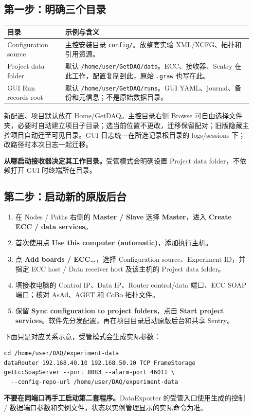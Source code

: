 \documentclass[11pt,a4paper]{article}
\newcommand{\ui}[1]{\textbf{#1}}
\newcommand{\code}[1]{\texttt{#1}}
\begin{document}
\subsection*{第一步：明确三个目录}
\par\smallskip\noindent\begin{tabularx}{\linewidth}{@{}L{43mm}Y@{}}\toprule
目录 & 示例与含义 \\\midrule
Configuration source & 主控安装目录 \code{config/}。放整套实验 XML/XCFG、拓扑和引用资源。\\
Project data folder & 默认 \code{/home/user/GetDAQ/data}。ECC、接收器、Sentry 在此工作，配置复制到此，原始 \code{.graw} 也写在此。\\
GUI Run records root & 默认 \code{/home/user/GetDAQ/runs}。GUI YAML、journal、备份和元信息；不是原始数据目录。\\\bottomrule
\end{tabularx}\par\smallskip
新配置、项目默认放在 Home/GetDAQ。主控目录右侧 Browse 可自由选择文件夹，必要时自动建立项目子目录；选当前位置不更改，迁移保留配对；旧版隐藏主控项目自动迁至可见目录。GUI 日志统一在所选记录根目录的 logs/sessions 下；改路径时本次日志一起迁移。\par
\textbf{从哪启动接收器决定其工作目录。}受管模式会明确设置 Project data folder，不依赖打开 GUI 时终端所在目录。
\subsection*{第二步：启动新的原版后台}
\begin{enumerate}
\item 在 Nodes / Paths 右侧的 \ui{Master / Slave} 选择 \ui{Master}，进入 \ui{Create ECC / data services}。
\item 首次使用点 \ui{Use this computer (automatic)}，添加执行主机。
\item 点 \ui{Add boards / ECC…}，选择 Configuration source、Experiment ID，并指定 ECC host / Data receiver host 及该主机的 Project data folder。
\item 填接收电脑的 Control IP、Data IP、Router control/data 端口、ECC SOAP 端口；核对 AsAd、AGET 和 CoBo 拓扑文件。
\item 保留 \ui{Sync configuration to project folders}，点击 \ui{Start project services}。软件先分发配置，再在项目目录启动原版后台和共享 Sentry。
\end{enumerate}
下面只是对应关系示意，受管模式会生成实际参数：
\begin{verbatim}
cd /home/user/DAQ/experiment-data
dataRouter 192.168.40.10 192.168.50.10 TCP FrameStorage
getEccSoapServer --port 8083 --alarm-port 46011 \
  --config-repo-url /home/user/DAQ/experiment-data
\end{verbatim}
\textbf{不要在同端口再手工启动第二套程序。}DataExporter 的受管入口使用生成的控制 / 数据端口参数和实例文件，状态以实例管理显示的实际命令为准。
\end{document}
